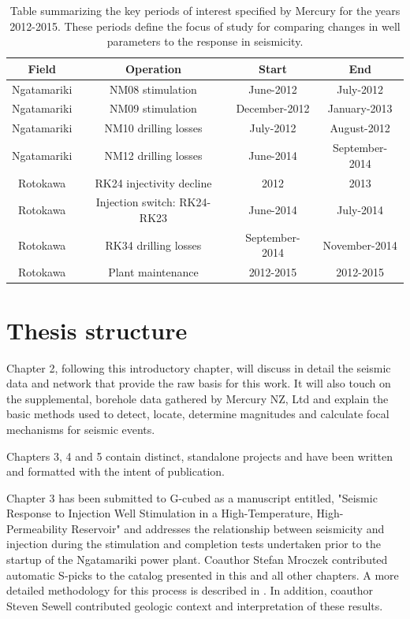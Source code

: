 \begin{table}
\begin{tabular}{cccc}
    {Field} & {Operation} & {Start} & {End}\\ \midrule
    Ngatamariki & NM08 stimulation & June-2012 & July-2012\\
    Ngatamariki & NM09 stimulation & December-2012 & January-2013\\
    Ngatamariki & NM10 drilling losses & July-2012 & August-2012\\
    Ngatamariki & NM12 drilling losses  & June-2014 & September-2014\\
    Rotokawa & RK24 \gls{injectivity} decline & 2012 & 2013\\
    Rotokawa & Injection switch: RK24-RK23 & June-2014 & July-2014\\
    Rotokawa & RK34 drilling losses & September-2014 & November-2014\\
    Rotokawa & Plant maintenance & 2012-2015 & 2012-2015\\
\end{tabular}
\caption[Periods of interest addressed in this thesis]{{
Table summarizing the key periods of interest specified by Mercury for the years 2012-2015. These periods define the focus of study for comparing
changes in well parameters to the response in seismicity.}}
\label{table:objectives}
\end{table}

\section{Thesis structure}
Chapter 2, following this introductory chapter, will discuss in detail the seismic data and network that provide the raw basis for this work. It will also touch on the supplemental, borehole data gathered by Mercury NZ, Ltd and explain the basic methods used to detect, locate, determine magnitudes and calculate focal mechanisms for seismic events.

Chapters 3, 4 and 5 contain distinct, standalone projects and have been written and formatted with the intent of publication.

Chapter 3 has been submitted to G-cubed as a manuscript entitled, "Seismic Response to Injection Well Stimulation in a High-Temperature, High-Permeability Reservoir" and addresses the relationship between seismicity and injection during the stimulation and completion tests undertaken prior to the startup of the Ngatamariki power plant. Coauthor Stefan Mroczek contributed automatic S-picks to the catalog presented in this and all other chapters. A more detailed methodology for this process is described in \citet{mroczek2016shear}. In addition, coauthor Steven Sewell contributed geologic context and interpretation of these results.

